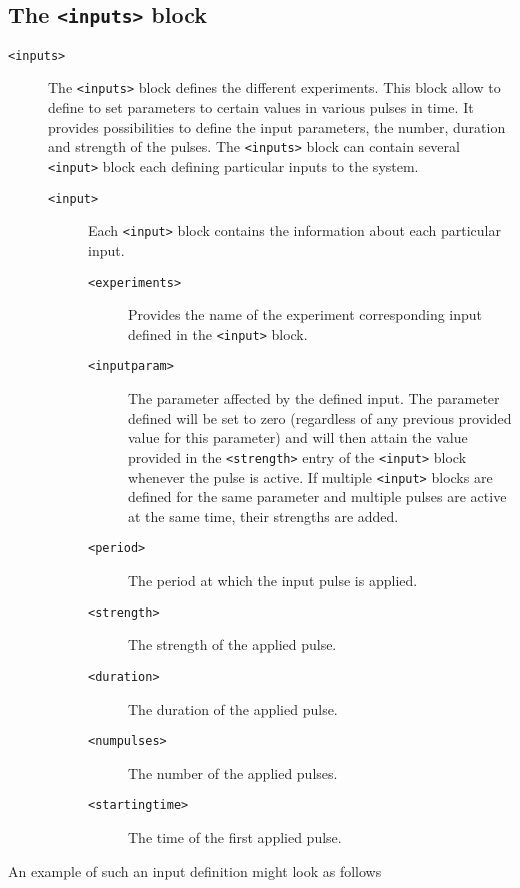 \documentclass[11pt]{article} %
\begin{document}
\subsection{The \texttt{<inputs>} block}
\begin{description}
\item[\texttt{<inputs>}]
The \texttt{<inputs>} block defines the different experiments. This block allow to define to set parameters to certain values in various pulses in time. It provides possibilities to define the input parameters, the number, duration and strength of the pulses. The \texttt{<inputs>} block can contain several \texttt{<input>} block each defining particular inputs to the system. 
\begin{description}
\item[\texttt{<input>}]Each \texttt{<input>} block contains the information about each particular input. 
\begin{description}
\item[\texttt{<experiments>}] Provides the name of the experiment corresponding input defined in the \texttt{<input>} block. 
\item[\texttt{<inputparam>}] The parameter affected by the defined input. The parameter defined will be set to zero (regardless of any previous provided value for this parameter) and will then attain the value provided in the \texttt{<strength>} entry of the \texttt{<input>} block whenever the pulse is active. If multiple \texttt{<input>} blocks are defined for the same parameter and multiple pulses are active at the same time, their strengths are added. 
\item[\texttt{<period>}] The period at which the input pulse is applied. 
\item[\texttt{<strength>}] The strength of the applied pulse.
\item[\texttt{<duration>}] The duration of the applied pulse.
\item[\texttt{<numpulses>}] The number of the applied pulses.
\item[\texttt{<startingtime>}] The time of the first applied pulse.
\end{description}
\end{description}
\end{description}
An example of such an input definition might look as follows
\end{document}
